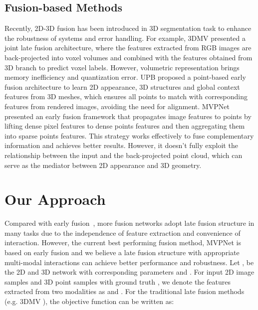 \documentclass[letterpaper, 10 pt, conference]{ieeeconf}
\begin{document}
\subsection{Fusion-based Methods}

Recently, 2D-3D fusion has been introduced in 3D segmentation task to enhance the robustness of systems and error handling. For example, 3DMV \cite{dai20183dmv} presented a joint late fusion architecture, where the features extracted from RGB images are back-projected into voxel volumes and combined with the features obtained from 3D branch to predict voxel labels. However, volumetric representation brings memory inefficiency and quantization error. UPB \cite{chiang2019unified} proposed a point-based early fusion architecture to learn 2D appearance, 3D structures and global context features from 3D meshes, which ensures all points to match with corresponding features from rendered images, avoiding the need for alignment. MVPNet \cite{jaritz2019multi} presented an early fusion framework that propagates image features to points by lifting dense pixel features to dense points features and then aggregating them into sparse points features. This strategy works effectively to fuse complementary information and achieves better results. However, it doesn't fully exploit the relationship between the input and the back-projected point cloud, which can serve as the mediator between 2D appearance and 3D geometry. 



\section{Our Approach}




Compared with early fusion~\cite{zhang2020deep}, more fusion networks adopt late fusion structure in many tasks \cite{Liu_2013_CVPR,zhang2019late,8451915} due to the independence of feature extraction and convenience of interaction. However, the current best performing fusion method, MVPNet \cite{jaritz2019multi} is based on early fusion and we believe a late fusion structure with appropriate multi-modal interactions can achieve better performance and robustness.
Let ,  be the 2D and 3D network with corresponding parameters  and . For input 2D image samples  and 3D point samples  with ground truth , we denote the features extracted from two modalities as  and . For the traditional late fusion methods (e.g. 3DMV \cite{dai20183dmv}), the objective function can be written as:
\end{document}
